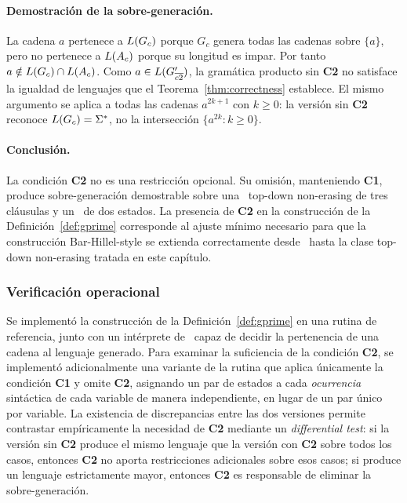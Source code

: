 \paragraph{Demostración de la sobre-generación.} La cadena $a$ pertenece a $L(G_c)$ porque $G_c$ genera todas las cadenas sobre $\{a\}$, pero no pertenece a $L(A_c)$ porque su longitud es impar. Por tanto $a \notin L(G_c) \cap L(A_c)$. Como $a \in L(G'_{\overline{c2}})$, la gramática producto sin \textbf{C2} no satisface la igualdad de lenguajes que el Teorema~\ref{thm:correctness} establece. El mismo argumento se aplica a todas las cadenas $a^{2k+1}$ con $k \geq 0$: la versión sin \textbf{C2} reconoce $L(G_c) = \Sigma^{*}$, no la intersección $\{a^{2k} : k \geq 0\}$.

\paragraph{Conclusión.} La condición \textbf{C2} no es una restricción opcional. Su omisión, manteniendo \textbf{C1}, produce sobre-generación demostrable sobre una \PRCG\ top-down non-erasing de tres cláusulas y un \AFD\ de dos estados. La presencia de \textbf{C2} en la construcción de la Definición~\ref{def:gprime} corresponde al ajuste mínimo necesario para que la construcción Bar-Hillel-style se extienda correctamente desde \sRCG\ hasta la clase top-down non-erasing tratada en este capítulo.

\subsubsection{Verificación operacional}

Se implementó la construcción de la Definición~\ref{def:gprime} en una rutina de referencia, junto con un intérprete de \PRCG\ capaz de decidir la pertenencia de una cadena al lenguaje generado. Para examinar la suficiencia de la condición \textbf{C2}, se implementó adicionalmente una variante de la rutina que aplica únicamente la condición \textbf{C1} y omite \textbf{C2}, asignando un par de estados a cada \emph{ocurrencia} sintáctica de cada variable de manera independiente, en lugar de un par único por variable. La existencia de discrepancias entre las dos versiones permite contrastar empíricamente la necesidad de \textbf{C2} mediante un \emph{differential test}: si la versión sin \textbf{C2} produce el mismo lenguaje que la versión con \textbf{C2} sobre todos los casos, entonces \textbf{C2} no aporta restricciones adicionales sobre esos casos; si produce un lenguaje estrictamente mayor, entonces \textbf{C2} es responsable de eliminar la sobre-generación.

